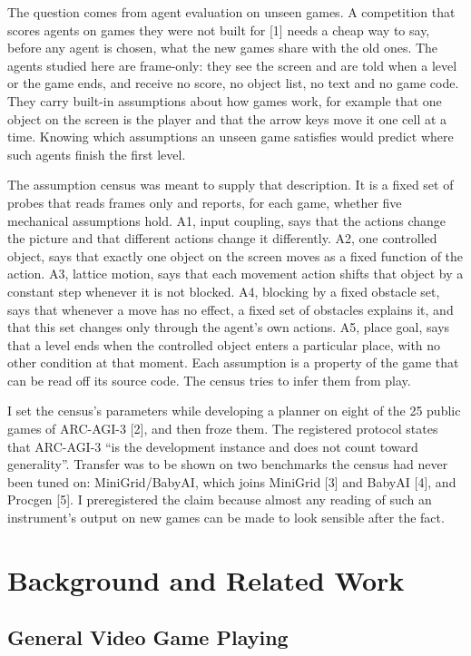 \documentclass[journal]{IEEEtran}
\begin{document}
The question comes from agent evaluation on unseen games. A competition
that scores agents on games they were not built for {[}1{]} needs a
cheap way to say, before any agent is chosen, what the new games share
with the old ones. The agents studied here are frame-only: they see the
screen and are told when a level or the game ends, and receive no score,
no object list, no text and no game code. They carry built-in
assumptions about how games work, for example that one object on the
screen is the player and that the arrow keys move it one cell at a time.
Knowing which assumptions an unseen game satisfies would predict where
such agents finish the first level.

The assumption census was meant to supply that description. It is a
fixed set of probes that reads frames only and reports, for each game,
whether five mechanical assumptions hold. A1, input coupling, says that
the actions change the picture and that different actions change it
differently. A2, one controlled object, says that exactly one object on
the screen moves as a fixed function of the action. A3, lattice motion,
says that each movement action shifts that object by a constant step
whenever it is not blocked. A4, blocking by a fixed obstacle set, says
that whenever a move has no effect, a fixed set of obstacles explains
it, and that this set changes only through the agent's own actions. A5,
place goal, says that a level ends when the controlled object enters a
particular place, with no other condition at that moment. Each
assumption is a property of the game that can be read off its source
code. The census tries to infer them from play.

I set the census's parameters while developing a planner on eight of the
25 public games of ARC-AGI-3 {[}2{]}, and then froze them. The
registered protocol states that ARC-AGI-3 ``is the development instance
and does not count toward generality''. Transfer was to be shown on two
benchmarks the census had never been tuned on: MiniGrid/BabyAI, which
joins MiniGrid {[}3{]} and BabyAI {[}4{]}, and Procgen {[}5{]}. I
preregistered the claim because almost any reading of such an
instrument's output on new games can be made to look sensible after the
fact.

\section{Background and Related Work}\label{background-and-related-work}

\subsection{General Video Game
Playing}\label{general-video-game-playing}
\end{document}

